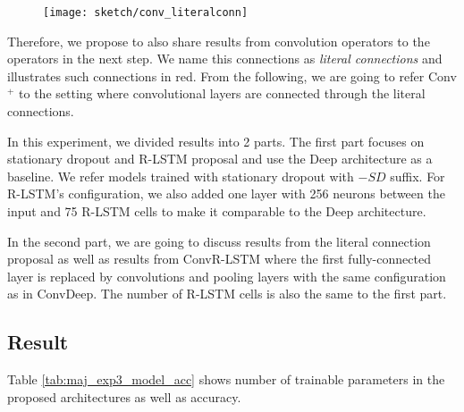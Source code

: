 

 \begin{figure}[!htb]
\centering
\texttt{[image: sketch/conv\_literalconn]}
\label{fig:conv_literalconn}
\end{figure}

Therefore, we propose to also share results from convolution operators to the operators in the next step. We name this connections as \textit{literal connections} and \addfigure{\ref{fig:conv_literalconn}} illustrates such connections in red. From the following, we are going to refer Conv$^+$ to the setting where convolutional layers are connected through the literal connections. 

In this experiment, we divided results into 2 parts. The first part focuses on stationary dropout and R-LSTM proposal and use the Deep architecture as a baseline. We refer models trained with stationary dropout with $-SD$ suffix. For R-LSTM's configuration, we also added one layer with 256 neurons between the input and 75 R-LSTM cells to make it comparable to the Deep architecture.  

In the second part, we are going to discuss results from the literal connection proposal as well as results from ConvR-LSTM where the first fully-connected layer is replaced by convolutions and pooling layers with the same configuration as in ConvDeep. The number of R-LSTM cells is also the same to the first part. 



\subsection{Result}
Table \ref{tab:maj_exp3_model_acc} shows number of trainable parameters in the proposed architectures as well as accuracy.

